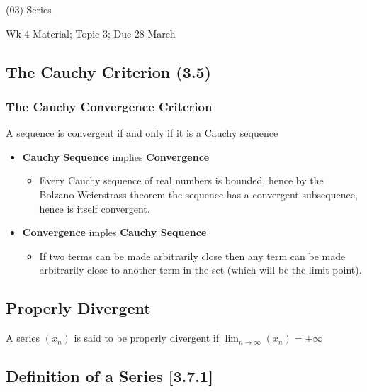 \documentclass[
]{article}
\date{}
\begin{document}
(03) Series

Wk 4 Material; Topic 3; Due 28 March

\tableofcontents

\hypertarget{header-n3124}{%
\subsection{The Cauchy Criterion (3.5)}\label{header-n3124}}

\hypertarget{header-n3125}{%
\subsubsection{The Cauchy Convergence Criterion}\label{header-n3125}}

A sequence is convergent if and only if it is a Cauchy sequence

\begin{itemize}
\item
  \textbf{Cauchy Sequence} implies \textbf{Convergence}

  \begin{itemize}
  \item
    Every Cauchy sequence of real numbers is bounded, hence by the
    Bolzano-Weierstrass theorem the sequence has a convergent
    subsequence, hence is itself convergent.
  \end{itemize}
\item
  \textbf{Convergence} imples \textbf{Cauchy Sequence}

  \begin{itemize}
  \item
    If two terms can be made arbitrarily close then any term can be made
    arbitrarily close to another term in the set (which will be the
    limit point).
  \end{itemize}
\end{itemize}

\hypertarget{header-n3138}{%
\subsection{Properly Divergent}\label{header-n3138}}

A series \((x_n)\) is said to be properly divergent if
\(\lim_{n\rightarrow \infty}(x_n) = \pm \infty\)

\hypertarget{header-n3140}{%
	\newpage
\subsection{Definition of a Series {[}3.7.1{]}}\label{header-n3140}}
\end{document}

